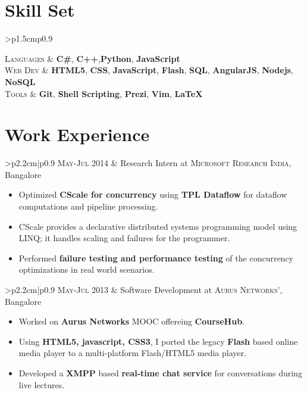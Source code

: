 \documentclass[a4paper,10pt]{article} %
\newcommand{\work}[3]{
    \begin{tabular}{>{\raggedleft}p{2.2cm}|p{0.9\linewidth}}
        \textsc{#1} & \textcolor{NavyBlue}{#2}
                    \footnotesize{#3}
    \end{tabular}
}
\newcommand{\itemlist}[1]{
    \begin{tabular}{>{\raggedleft}p{1.5cm}p{0.9\linewidth}}
        #1
    \end{tabular}
}
\begin{document}
\section{Skill Set}

\itemlist {
    \textsc{Languages} %
            & \textbf{C\#}, \textbf{C++},\textbf{Python}, \textbf{JavaScript} \\
    \textsc{Web Dev} %
            & \textbf{HTML5}, \textbf{CSS}, \textbf{JavaScript}, \textbf{Flash}, \textbf{SQL},
              \textbf{AngularJS}, \textbf{Nodejs}, \textbf{NoSQL}\\
    \textsc{Tools} %
            & \textbf{Git}, \textbf{Shell Scripting}, \textbf{Prezi}, \textbf{Vim}, \textbf{LaTeX}\\
}


\section{Work Experience}

\work {May-Jul 2014}
      {Research Intern at \textsc{Microsoft Research India}, Bangalore}
      {
         \begin{itemize}[leftmargin=*]
             \item Optimized \textbf{CScale for concurrency} using \textbf{TPL Dataflow}
                 for dataflow computations and pipeline processing.
             \item CScale provides a declarative distributed systems programming
                 model using LINQ; it handles scaling and failures for the programmer.
             \item Performed \textbf{failure testing and performance testing}
                 of the concurrency optimizations in real world scenarios.
         \end{itemize}
     }

\work {May-Jul 2013}
      {Software Development at \textsc{Aurus Networks'}, Bangalore}
      {
          \begin{itemize}[leftmargin=*]
              \item Worked on \textbf{Aurus Networks} MOOC offereing \textbf{CourseHub}.
              \item Using \textbf{HTML5, javascript, CSS3}, I ported the legacy
                  \textbf{Flash} based online media player to a multi-platform
                  Flash/HTML5 media player.
              \item Developed a \textbf{XMPP} based \textbf{real-time chat service} for
                  conversations during live lectures.
          \end{itemize}
      }
\end{document}
